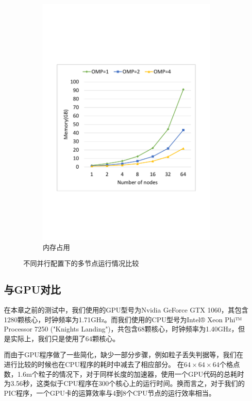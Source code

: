 \begin{figure}[!htb]
\begin{subfigure}[b]{0.48\textwidth}
        \includegraphics[width=\textwidth]{Img/PIC_speedup_Cori_multi_nodes_memory.pdf}
        \caption{内存占用}
    \end{subfigure}
    \caption{不同并行配置下的多节点运行情况比较}
    \label{fig:PIC_speedup_Cori_multi_nodes_timeMemory}
\end{figure}

\subsection{与GPU对比}

在本章之前的测试中，我们使用的GPU型号为Nvidia GeForce GTX 1060，其包含1280颗核心，时钟频率为1.71GHz。而我们使用的CPU型号为Intel® Xeon Phi™ Processor 7250 ("Knights Landing")，共包含68颗核心，时钟频率为1.40GHz，但是实际上，我们只是使用了64颗核心。

而由于GPU程序做了一些简化，缺少一部分步骤，例如粒子丢失判据等，我们在进行比较的时候也在CPU程序的耗时中减去了相应部分。
在$64 \times 64 \times 64$个格点数，1.6m个粒子的情况下，对于同样长度的加速器，使用一个GPU代码的总耗时为3.56秒，这类似于CPU程序在300个核心上的运行时间。换而言之，对于我们的PIC程序，一个GPU卡的运算效率与4到8个CPU节点的运行效率相当。


